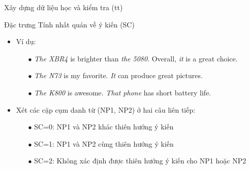 \documentclass[9pt,xcolor=table,hyperref=unicode]{beamer}
\begin{document}
	\begin{frame}{Xây dựng dữ liệu học và kiểm tra (tt)}
		\begin{block}{Đặc trưng Tính nhất quán về ý kiến (SC)}
			\begin{itemize}
				\item{Ví dụ:\\
				\begin{itemize}
					\item[$\bullet$]{\textit{The XBR4} is brighter than \textit{the 5080}. Overall, \textit{it} is a great choice.}
					\item[$\bullet$]{\textit{The N73} is my favorite. \textit{It} can produce great pictures.}
					\item[$\bullet$]{\textit{The K800} is awesome. \textit{That phone} has short battery life.}
				\end{itemize}}
				\item{Xét các cặp cụm danh từ (NP1, NP2) ở hai câu liên tiếp: \\
					\begin{itemize}
						\item[$\bullet$]{SC=0: NP1 và NP2 khác thiên hướng ý kiến}
						\item[$\bullet$]{SC=1: NP1 và NP2 cùng thiên hướng ý kiến}
						\item[$\bullet$]{SC=2: Không xác định được thiên hướng ý kiến cho NP1 hoặc NP2}
					\end{itemize}}
			\end{itemize}
		\end{block}		
	\end{frame}
\end{document}
